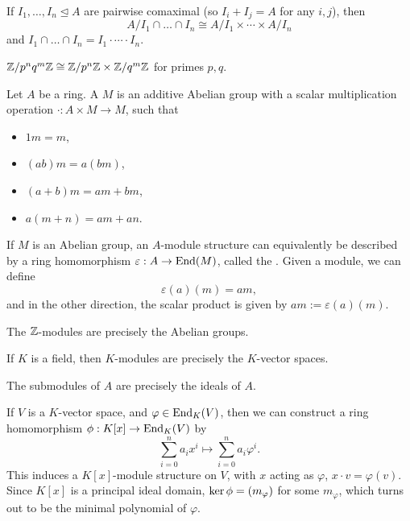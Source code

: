 \begin{theorem}
  If $I_1, \ldots, I_n \trianglelefteq A$ are pairwise comaximal (so $I_i + I_j
  = A$ for any $i, j$), then
  \[
	A / I_1 \cap \ldots \cap I_n \cong A/I_1 \times \cdots \times A / I_n
  \]
  and $I_1 \cap \ldots \cap I_n = I_1 \cdot \cdots \cdot I_n$.
\end{theorem}

\begin{example}
  $\mathbb{Z} / p^n q^m \mathbb{Z} \cong \mathbb{Z}/ p^n \mathbb{Z} \times \mathbb{Z}/q^m \mathbb{Z}$ for primes $p, q$.
\end{example}


\begin{definition}
  Let $A$ be a ring. A  $M$ is an additive Abelian group with a
  scalar multiplication operation $\cdot: A \times M \to M$, such that
  \begin{itemize}
  \item $1 m = m$,
  \item $(ab)m = a(bm)$,
  \item $(a+b)m = am + bm$,
  \item $a(m+n) = am + an$.
  \end{itemize}
\end{definition}

If $M$ is an Abelian group, an $A$-module structure can equivalently be
described by a ring homomorphism $\varepsilon: A \to \operatorname{End}(M)$, called the
.
Given a module, we can define
\[
  \varepsilon(a)(m) = am,
\]
and in the other direction, the scalar product is given by $am :=
\varepsilon(a)(m)$.

\begin{example}
  The $\mathbb{Z}$-modules are precisely the Abelian groups.
\end{example}

\begin{example}
  If $K$ is a field, then $K$-modules are precisely the $K$-vector spaces.
\end{example}

\begin{remark}
  The submodules of $A$ are precisely the ideals of $A$.
\end{remark}

\begin{example}
  If $V$ is a $K$-vector space, and $\varphi \in \operatorname{End}_K(V)$, then we can
  construct a ring homomorphism $\phi: K[x] \to \operatorname{End}_K(V)$ by
  \[
	\sum_{i=0}^n a_i x^i \mapsto \sum_{i=0}^n a_i \varphi^i.
  \]
  This induces a $K[x]$-module structure on $V$, with $x$ acting as $\varphi$,
  $x \cdot v = \varphi(v)$.
  Since $K[x]$ is a principal ideal domain, $\operatorname{ker} \phi = (m_\varphi)$ for some
  $m_\varphi$, which turns out to be the minimal polynomial of $\varphi$.
\end{example}

